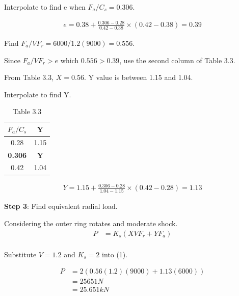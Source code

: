 \documentclass[a4paper, fleqn]{article}
\begin{document}
Interpolate to find e when \(F_a/C_s = 0.306\).

\begin{equation*}
    \begin{aligned}
        e = 0.38 + \frac{0.306 - 0.28}{0.42 - 0.38} \times (0.42 - 0.38) = 0.39
    \end{aligned}
\end{equation*}

Find \(F_a/VF_r = 6000/1.2(9000) = 0.556\). 

Since \(F_a/VF_r>e\) which \(0.556 > 0.39\), use the second column of Table 3.3.

From Table 3.3, \(X=0.56\). Y value is between 1.15 and 1.04.

Interpolate to find Y.

\begin{table}
    \centering
    \begin{tabular}{|c|c|}
        \hline
        \(F_a/C_s\) & Y\\
        \hline
        0.28 & 1.15\\
        \hline
        \textbf{0.306} & \textbf{Y} \\
        \hline
        0.42 & 1.04\\
        \hline
    \end{tabular}
    \caption{Table 3.3}
\end{table}

\begin{equation*}
    \begin{aligned}
        Y = 1.15 + \frac{0.306 - 0.28}{1.04 - 1.15} \times (0.42 - 0.28) = 1.13
    \end{aligned}
\end{equation*}

\vspace{10pt}
\textbf{Step 3}: Find equivalent radial load.

Considering the outer ring rotates and moderate shock.
\begin{equation}
    \begin{aligned}
        P &= K_s(XVF_r + YF_a) \\
    \end{aligned}
\end{equation}

Substitute \(V=1.2\) and \(K_s=2\) into (1).

\begin{equation*}
    \begin{aligned}
        P&= 2(0.56(1.2)(9000) + 1.13(6000)) \\
        &= 25651 N \\
        &= 25.651 kN
    \end{aligned}
\end{equation*}
\end{document}
